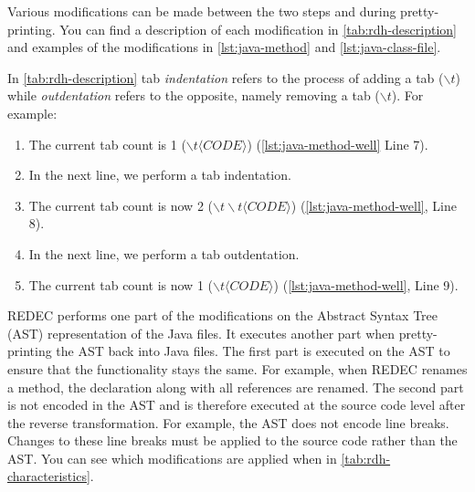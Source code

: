 \documentclass[%
class=scrreprt,
chapterprefix=false,%
open=right,%
twoside=true,%
paper=a4,%
logofile={Logo\_zentral\_farbig\_EN.png},%
thesistype=master,%
UKenglish,%
]{se2thesis}
\theoremstyle{definition}
\newcommand{\rdh}{REDEC\xspace}
\begin{document}
	
	Various modifications can be made between the two steps and during pretty-printing. You can find a description of each modification in \autoref{tab:rdh-description} and examples of the modifications in \autoref{lst:java-method} and \autoref{lst:java-class-file}.
	
	In \autoref{tab:rdh-description} tab \textit{indentation} refers to the process of adding a tab ($\backslash t$) while \textit{outdentation} refers to the opposite, namely removing a tab ($\backslash t$). 
	For example:
	\begin{enumerate}
		\item The current tab count is 1 ($\backslash t \langle CODE \rangle$) (\autoref{lst:java-method-well} Line 7).
		\item In the next line, we perform a tab indentation.
		\item The current tab count is now 2 ($\backslash t \backslash t \langle CODE \rangle $) (\autoref{lst:java-method-well}, Line 8).
		\item In the next line, we perform a tab outdentation.
		\item The current tab count is now 1 ($\backslash t \langle CODE \rangle $) (\autoref{lst:java-method-well}, Line 9).
	\end{enumerate}
		
	\rdh performs one part of the modifications on the Abstract Syntax Tree (AST) representation of the Java files. It executes another part when pretty-printing the AST back into Java files. The first part is executed on the AST to ensure that the functionality stays the same. For example, when REDEC renames a method, the declaration along with all references are renamed.	
	The second part is not encoded in the AST and is therefore executed at the source code level after the reverse transformation. For example, the AST does not encode line breaks. Changes to these line breaks must be applied to the source code rather than the AST. You can see which modifications are applied when in \autoref{tab:rdh-characteristics}.
	
\end{document}
